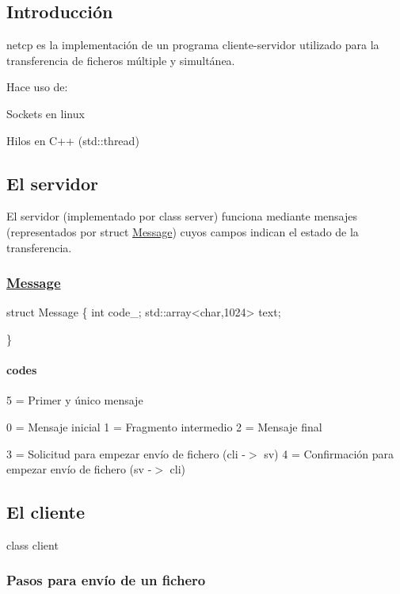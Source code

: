 \subsection*{Introducción}

{\ttfamily netcp} es la implementación de un programa cliente-\/servidor utilizado para la transferencia de ficheros múltiple y simultánea.

Hace uso de\+:
\begin{DoxyItemize}
\item Sockets en linux
\item Hilos en C++ ({\ttfamily std\+::thread})
\end{DoxyItemize}

\subsection*{El servidor}

El servidor (implementado por {\ttfamily class server}) funciona mediante mensajes (representados por {\ttfamily struct \hyperlink{structMessage}{Message}}) cuyos campos indican el estado de la transferencia. \subsubsection*{\hyperlink{structMessage}{Message}}


\begin{DoxyCode}
struct Message \{
  int code\_;
  std::array<char,1024> text;

\}
\end{DoxyCode}
 \paragraph*{codes}

5 = Primer y único mensaje

0 = Mensaje inicial 1 = Fragmento intermedio 2 = Mensaje final

3 = Solicitud para empezar envío de fichero (cli -\/$>$ sv) 4 = Confirmación para empezar envío de fichero (sv -\/$>$ cli)

\subsection*{El cliente}

{\ttfamily class client} \subsubsection*{Pasos para envío de un fichero}


